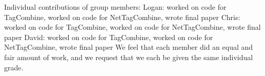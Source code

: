 \documentclass[11pt]{IEEEtran}
\begin{document}
\appendix

Individual contributions of group members:
Logan: worked on code for TagCombine, worked on code for NetTagCombine, wrote final paper
Chris: worked on code for TagCombine, worked on code for NetTagCombine, wrote final paper
David: worked on code for TagCombine, worked on code for NetTagCombine, wrote final paper
We feel that each member did an equal and fair amount of work, and we request that we each be given the same individual grade.


\end{document}
